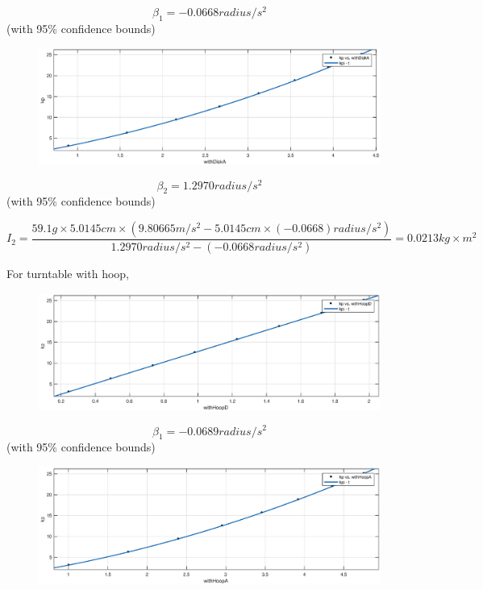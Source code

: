 $$ \beta_1 = -0.0668 radius/s^2$$ (with 95\% confidence bounds) 

\begin{figure}[H]
\centering
\includegraphics[width=\EFWwr]{matlab/wda}
\end{figure}

$$ \beta_2 = 1.2970 radius/s^2$$ (with 95\% confidence bounds) 

$$ I_2 = \frac{59.1 g \times 5.0145 cm \times (9.80665 m/s^2 - 5.0145 cm \times (-0.0668) radius/s^2 )}{1.2970 radius/s^2 -(-0.0668 radius/s^2) } = 0.0213 kg\times m^2 $$


For turntable with hoop,

\begin{figure}[H]
\centering
\includegraphics[width=\EFWwr]{matlab/whd}
\end{figure}

$$ \beta_1 = -0.0689 radius/s^2$$ (with 95\% confidence bounds) 

\begin{figure}[H]
\centering
\includegraphics[width=\EFWwr]{matlab/wha}
\end{figure}

